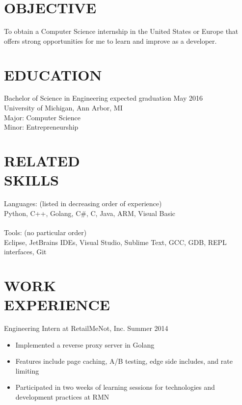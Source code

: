 \documentclass[line,margin]{res}
\begin{document}

\color{HeaderColor}
\address{ajlj@umich.edu -- 248-622-7017}
\address{Citizen of the United States and Italy}
 
 \renewcommand{\labelitemi}{$-$}
 
\begin{resume}
\color{black}
\section{\textcolor{HeaderColor}{OBJECTIVE}}
				To obtain a Computer Science internship in the United States or Europe that offers strong opportunities for me to learn and improve as a developer.

\section{\textcolor{HeaderColor}{EDUCATION}} {\sc Bachelor of Science in Engineering} \hfill expected graduation May 2016\\
				University of Michigan, Ann Arbor, MI \\
                Major: Computer Science \\
                Minor: Entrepreneurship
 
\section{\textcolor{HeaderColor}{RELATED \\ SKILLS}} 
				{\sc Languages: (listed in decreasing order of experience)} \\
				Python, C++, Golang, C\#, C, Java, ARM, Visual Basic \\ \\
                {\sc Tools: (no particular order)} \\
                Eclipse, JetBrains IDEs, Visual Studio, Sublime Text, GCC, GDB, REPL interfaces, Git
 
\section{\textcolor{HeaderColor}{WORK \\ EXPERIENCE}} 
                {\sc Engineering Intern at RetailMeNot, Inc.} \hfill Summer 2014
                 \begin{itemize}  \itemsep -2pt %
                 \item Implemented a reverse proxy server in Golang
                 \item Features include page caching, A/B testing, edge side includes, and rate limiting
                 \item Participated in two weeks of learning sessions for technologies and development practices at RMN
                 \end{itemize}


\end{resume}
\end{document}

